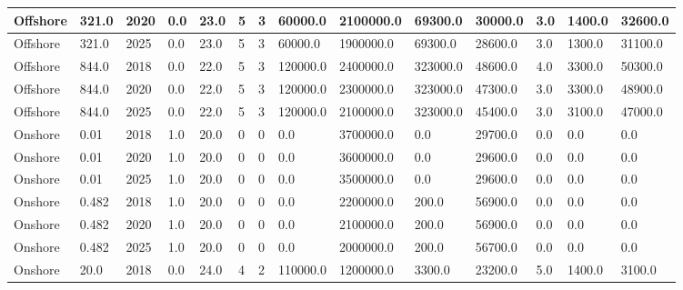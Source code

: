 \documentclass[sigconf]{acmart}
\begin{document}
\begin{table*}[]
\begin{tabularx}{\linewidth}{|p{}|l|l|l|l|l|l|l|l|l|l|l|l|l|}
Offshore                      & 321.0       & 2020             & 0.0    & 23.0 & 5     & 3     & 60000.0  & 2100000.0 & 69300.0  & 30000.0 & 3.0   & 1400.0  & 32600.0  \\ \hline
Offshore                      & 321.0       & 2025             & 0.0    & 23.0 & 5     & 3     & 60000.0  & 1900000.0 & 69300.0  & 28600.0 & 3.0   & 1300.0  & 31100.0  \\ \hline
Offshore                      & 844.0       & 2018             & 0.0    & 22.0 & 5     & 3     & 120000.0 & 2400000.0 & 323000.0 & 48600.0 & 4.0   & 3300.0  & 50300.0  \\ \hline
Offshore                      & 844.0       & 2020             & 0.0    & 22.0 & 5     & 3     & 120000.0 & 2300000.0 & 323000.0 & 47300.0 & 3.0   & 3300.0  & 48900.0  \\ \hline
Offshore                      & 844.0       & 2025             & 0.0    & 22.0 & 5     & 3     & 120000.0 & 2100000.0 & 323000.0 & 45400.0 & 3.0   & 3100.0  & 47000.0  \\ \hline
Onshore                       & 0.01        & 2018             & 1.0    & 20.0 & 0     & 0     & 0.0      & 3700000.0 & 0.0      & 29700.0 & 0.0   & 0.0     & 0.0      \\ \hline
Onshore                       & 0.01        & 2020             & 1.0    & 20.0 & 0     & 0     & 0.0      & 3600000.0 & 0.0      & 29600.0 & 0.0   & 0.0     & 0.0      \\ \hline
Onshore                       & 0.01        & 2025             & 1.0    & 20.0 & 0     & 0     & 0.0      & 3500000.0 & 0.0      & 29600.0 & 0.0   & 0.0     & 0.0      \\ \hline
Onshore                       & 0.482       & 2018             & 1.0    & 20.0 & 0     & 0     & 0.0      & 2200000.0 & 200.0    & 56900.0 & 0.0   & 0.0     & 0.0      \\ \hline
Onshore                       & 0.482       & 2020             & 1.0    & 20.0 & 0     & 0     & 0.0      & 2100000.0 & 200.0    & 56900.0 & 0.0   & 0.0     & 0.0      \\ \hline
Onshore                       & 0.482       & 2025             & 1.0    & 20.0 & 0     & 0     & 0.0      & 2000000.0 & 200.0    & 56700.0 & 0.0   & 0.0     & 0.0      \\ \hline
Onshore                       & 20.0        & 2018             & 0.0    & 24.0 & 4     & 2     & 110000.0 & 1200000.0 & 3300.0   & 23200.0 & 5.0   & 1400.0  & 3100.0   \\ \hline

\end{tabularx}
\end{table*}
\end{document}
